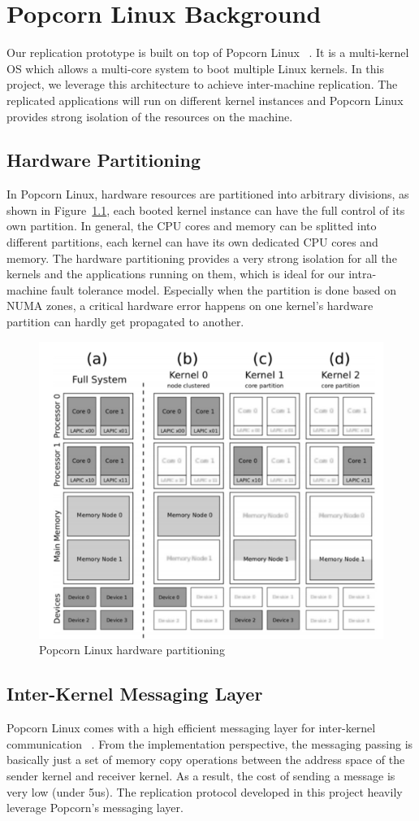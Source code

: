 \chapter{Popcorn Linux Background}
Our replication prototype is built on top of Popcorn Linux ~\cite{barbalace2014popcorn}. It is a multi-kernel OS which allows a multi-core system to boot multiple Linux kernels. In this project, we leverage this architecture to achieve inter-machine replication. The replicated applications will run on different kernel instances and Popcorn Linux provides strong isolation of the resources on the machine.
\section{Hardware Partitioning}
In Popcorn Linux, hardware resources are partitioned into arbitrary divisions, as shown in Figure~\ref{f:popcorn_arch}, each booted kernel instance can have the full control of its own partition. In general, the CPU cores and memory can be splitted into different partitions, each kernel can have its own dedicated CPU cores and memory. The hardware partitioning provides a very strong isolation for all the kernels and the applications running on them, which is ideal for our intra-machine fault tolerance model. Especially when the partition is done based on NUMA zones, a critical hardware error happens on one kernel's hardware partition can hardly get propagated to another.

\begin{figure}[!ht]
\centering
\includegraphics[width=.6\columnwidth]{figures/popcorn_arch}
 \caption{Popcorn Linux hardware partitioning}
 \label{f:popcorn_arch}
\end{figure}

\section{Inter-Kernel Messaging Layer}
Popcorn Linux comes with a high efficient messaging layer for inter-kernel communication ~\cite{shelton2013popcorn}. From the implementation perspective, the messaging passing is basically just a set of memory copy operations between the address space of the sender kernel and receiver kernel. As a result, the cost of sending a message is very low (under 5us). The replication protocol developed in this project heavily leverage Popcorn’s messaging layer.

